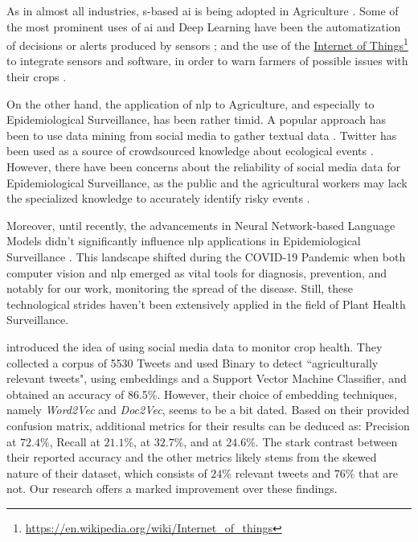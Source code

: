\label{03_related_work}


As in almost all industries, \neuralNetwork{}s-based \gls{ai} is being adopted in Agriculture . Some of the most prominent uses of \gls{ai} and Deep Learning have been the automatization of decisions or alerts produced by sensors ;  and the use of the \href{https://en.wikipedia.org/wiki/Internet_of_things}{Internet of Things}\footnote{\url{https://en.wikipedia.org/wiki/Internet_of_things}} to integrate sensors and software, in order to warn farmers of possible issues with their crops . 

On the other hand, the application of \gls{nlp} to Agriculture, and especially to Epidemiological Surveillance, has been rather timid. A popular approach has been to use data mining from social media to gather textual data . Twitter has been used as a source of crowdsourced knowledge about ecological events . However, there have been concerns about the reliability of social media data for Epidemiological Surveillance, as the public and the agricultural workers may lack the specialized knowledge to accurately identify risky events .


Moreover, until recently, the advancements in Neural Network-based Language Models didn't significantly influence \gls{nlp} applications in Epidemiological Surveillance .
This landscape shifted during the COVID-19 Pandemic when both computer vision and \gls{nlp} emerged as vital tools for diagnosis, prevention, and notably for our work, monitoring the spread of the disease. Still, these technological strides haven't been extensively applied in the field of Plant Health Surveillance.


 introduced the idea of using social media data to monitor crop health. They collected a corpus of 5530 Tweets and used Binary \textclassification{} to detect ``agriculturally relevant tweets", using embeddings and a Support Vector Machine Classifier, and obtained an accuracy of 86.5\%. 
However, their choice of embedding techniques, namely \emph{Word2Vec} and \emph{Doc2Vec}, seems to be a bit dated.
Based on their provided confusion matrix, additional metrics for their results can be deduced as: Precision at $72.4\%$, Recall at $21.1\%$, \fOne{} at $32.7\%$, and \fTwo{} at $24.6\%$.
 The stark contrast between their reported accuracy and the other metrics likely stems from the skewed nature of their dataset, which consists of $24\%$ relevant tweets and $76\%$ that are not. Our research offers a marked improvement over these findings.


